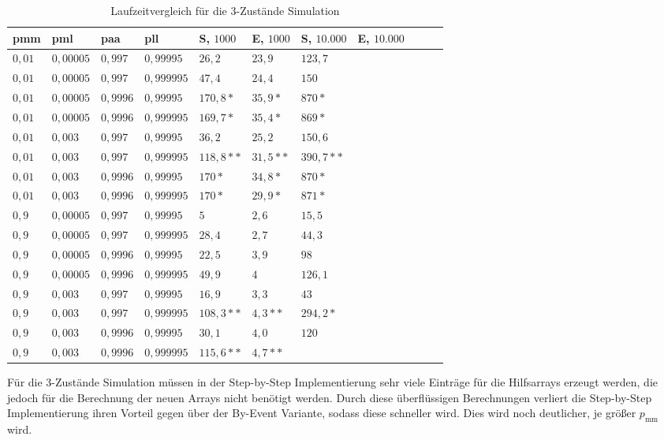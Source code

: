 \begin{table}[h]
\centering
\caption{Laufzeitvergleich für die 3-Zustände Simulation}
\label{3s_laufzeit}
\begin{tabular}{|l|l|l|l||l|l|l|l|l|l|l|}
\hline
pmm & pml & paa & pll & S, $1000$ & E, $1000$ & S, $10.000$ & E, $10.000$ \\ \hline \hline
$ 0,01 $ & $0,00005$ & $0,997$  & $0,99995$  & $26,2   $ & $23,9  $ & $123,7 $ & $ $  \\ \hline
$ 0,01 $ & $0,00005$ & $0,997$  & $0,999995$ & $47,4   $ & $24,4  $ & $150 $ & $ $  \\ \hline
$ 0,01 $ & $0,00005$ & $0,9996$ & $0,99995$  & $170,8* $ & $35,9* $ & $870* $ & $ $  \\ \hline
$ 0,01 $ & $0,00005$ & $0,9996$ & $0,999995$ & $169,7* $ & $35,4* $ & $869* $ & $ $  \\ \hline
$ 0,01 $ & $0,003 $  & $0,997$  & $0,99995$  & $36,2   $ & $25,2  $ & $150,6 $ & $ $  \\ \hline
$ 0,01 $ & $0,003 $  & $0,997$  & $0,999995$ & $118,8**$ & $31,5**$ & $390,7**$ & $ $  \\ \hline
$ 0,01 $ & $0,003 $  & $0,9996$ & $0,99995$  & $170*   $ & $34,8* $ & $870* $ & $ $  \\ \hline
$ 0,01 $ & $0,003 $  & $0,9996$ & $0,999995$ & $170*   $ & $29,9* $ & $871* $ & $ $  \\ \hline
$ 0,9  $ & $0,00005$ & $0,997$  & $0,99995$  & $5      $ & $2,6 $   & $15,5 $ & $ $  \\ \hline
$ 0,9  $ & $0,00005$ & $0,997$  & $0,999995$ & $28,4   $ & $2,7 $   & $44,3 $ & $ $  \\ \hline
$ 0,9  $ & $0,00005$ & $0,9996$ & $0,99995$  & $22,5   $ & $3,9 $   & $98 $ & $ $  \\ \hline
$ 0,9  $ & $0,00005$ & $0,9996$ & $0,999995$ & $49,9   $ & $4 $     & $126,1 $ & $ $  \\ \hline
$ 0,9  $ & $0,003 $  & $0,997$  & $0,99995$  & $16,9   $ & $3,3 $   & $43 $ & $ $  \\ \hline
$ 0,9  $ & $0,003 $  & $0,997$  & $0,999995$ & $108,3**$ & $4,3** $ & $294,2* $ & $ $  \\ \hline
$ 0,9  $ & $0,003 $  & $0,9996$ & $0,99995$  & $30,1   $ & $4,0 $   & $120 $ & $ $  \\ \hline
$ 0,9  $ & $0,003 $  & $0,9996$ & $0,999995$ & $115,6**$ & $4,7** $ & $ $ & $ $  \\ \hline
\end{tabular}
\end{table}
Für die 3-Zustände Simulation müssen in der Step-by-Step Implementierung sehr viele Einträge für die Hilfsarrays erzeugt werden, die jedoch für die Berechnung der neuen Arrays nicht benötigt werden. Durch diese überflüssigen Berechnungen verliert die Step-by-Step Implementierung ihren Vorteil gegen über der By-Event Variante, sodass diese schneller wird. Dies wird noch deutlicher, je größer $p_{\text{mm}}$ wird.

